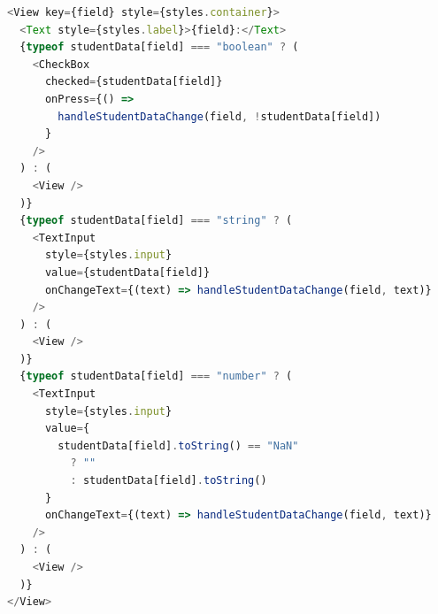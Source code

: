 \begin{lstlisting}[language=typescript,caption=Code to display one field,label=lst:impl:field]
<View key={field} style={styles.container}>
  <Text style={styles.label}>{field}:</Text>
  {typeof studentData[field] === "boolean" ? (
    <CheckBox
      checked={studentData[field]}
      onPress={() =>
        handleStudentDataChange(field, !studentData[field])
      }
    />
  ) : (
    <View />
  )}
  {typeof studentData[field] === "string" ? (
    <TextInput
      style={styles.input}
      value={studentData[field]}
      onChangeText={(text) => handleStudentDataChange(field, text)}
    />
  ) : (
    <View />
  )}
  {typeof studentData[field] === "number" ? (
    <TextInput
      style={styles.input}
      value={
        studentData[field].toString() == "NaN"
          ? ""
          : studentData[field].toString()
      }
      onChangeText={(text) => handleStudentDataChange(field, text)}
    />
  ) : (
    <View />
  )}
</View>
\end{lstlisting}

\FloatBarrier

